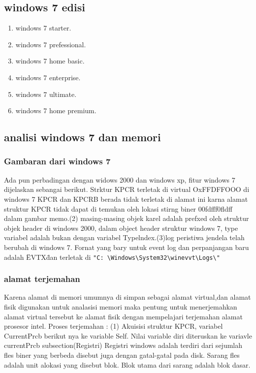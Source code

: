 \begin{enumerate}
		\subsection{windows 7 edisi}
		\begin{enumerate}
			\item windows 7 starter.
			\item windows 7 prefessional.
			\item windows 7 home basic.
			\item windows 7 enterprise.
			\item windows 7 ultimate.
			\item windows 7 home premium.
		\end{enumerate}	
		\subsection{analisi windows 7 dan memori}
			\subsubsection{Gambaran dari windows 7}
				Ada pun perbadingan dengan widows 2000 dan windows xp, fitur windows 7 
				dijelaskan sebangai berikut. Strktur KPCR terletak di virtual OxFFDFFOOO
				di windows 7 KPCR dan KPCRB berada tidak terletak di alamat ini karna
				alamat struktur KPCR tidak dapat di temukan oleh lokasi stirng biner 
				00fdfff0fldff dalam gambar memo.(2) masing-masing objek karel adalah 
				prefxed oleh struktur objek header di windows 2000, dalam object header
				struktur windows 7, type variabel adalah bukan dengan variabel 
				Typelndex.(3)log peristiwa jendela telah berubah di windows 7. Fornat 
				yang bary untuk event log dan perpanjangan baru adalah \"EVTX\" 
				dan terletak di \verb|"C: \Windows\System32\winevvt\Logs\"|
		\subsubsection{alamat terjemahan}
			Karena alamat di memori umumnya di simpan sebagai alamat virtual,dan 
			alamat fisik digunakan untuk analasisi memori maka pentung untuk 
			menerjemahkan alamat virtual tersebut ke alamat fisik dengan 
			mempelajari terjemahan alamat prosesor intel. Proses terjemahan :  
			(1) Akuisisi struktur KPCR, variabel CurrentPrcb berikut nya ke 
			variable Self. Nilai variable diri diteruskan ke variavle currentPrcb 
			subsection(Registri)
			Registri windows adalah terdiri dari sejumlah fles biner yang berbeda 
			disebut juga dengan gatal-gatal pada disk. Sarang fles adalah unit 
			alokasi yang disebut blok. Blok utama dari sarang adalah blok dasar.


\end{enumerate}
